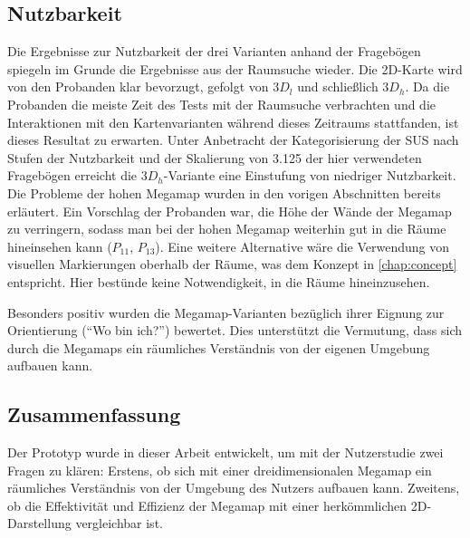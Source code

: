 \subsection{Nutzbarkeit}
Die Ergebnisse zur Nutzbarkeit der drei Varianten anhand der Fragebögen spiegeln im Grunde die Ergebnisse aus der Raumsuche wieder.
Die 2D-Karte wird von den Probanden klar bevorzugt, gefolgt von $3D_l$ und schließlich $3D_h$.
Da die Probanden die meiste Zeit des Tests mit der Raumsuche verbrachten und die Interaktionen mit den Kartenvarianten während dieses Zeitraums stattfanden, ist dieses Resultat zu erwarten.
Unter Anbetracht der Kategorisierung der SUS nach Stufen der Nutzbarkeit \autocite{Brooke2013} und der Skalierung von \num{3,125} der hier verwendeten Fragebögen erreicht die $3D_h$-Variante eine Einstufung von niedriger Nutzbarkeit.
Die Probleme der hohen Megamap wurden in den vorigen Abschnitten bereits erläutert.
Ein Vorschlag der Probanden war, die Höhe der Wände der Megamap zu verringern, sodass man bei der hohen Megamap weiterhin gut in die Räume hineinsehen kann ($P_{11}$, $P_{13}$).
Eine weitere Alternative wäre die Verwendung von visuellen Markierungen oberhalb der Räume, was dem Konzept in \autoref{chap:concept} entspricht.
Hier bestünde keine Notwendigkeit, in die Räume hineinzusehen.

Besonders positiv wurden die Megamap-Varianten bezüglich ihrer Eignung zur Orientierung (\enquote{Wo bin ich?}) bewertet.
Dies unterstützt die Vermutung, dass sich durch die Megamaps ein räumliches Verständnis von der eigenen Umgebung aufbauen kann.

\subsection{Zusammenfassung}
Der Prototyp wurde in dieser Arbeit entwickelt, um mit der Nutzerstudie zwei Fragen zu klären:
Erstens, ob sich mit einer dreidimensionalen Megamap ein räumliches Verständnis von der Umgebung des Nutzers aufbauen kann.
Zweitens, ob die Effektivität und Effizienz der Megamap mit einer herkömmlichen 2D-Darstellung vergleichbar ist.

